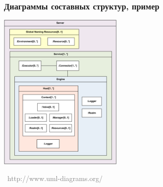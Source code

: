 \documentclass[xetex,mathserif,serif]{beamer}
\newcommand{\attribution}[1] {
	\vspace{-5mm}\begin{flushright}\begin{scriptsize}\textcolor{gray}{\textcopyright\, #1}\end{scriptsize}\end{flushright}
}
\begin{document}
	\begin{frame}
		\frametitle{Диаграммы составных структур, пример}
		\begin{center}
			\includegraphics[width=0.45\textwidth]{compositeStructureExample.png}
			\attribution{http://www.uml-diagrams.org/}
		\end{center}
	\end{frame}
\end{document}
